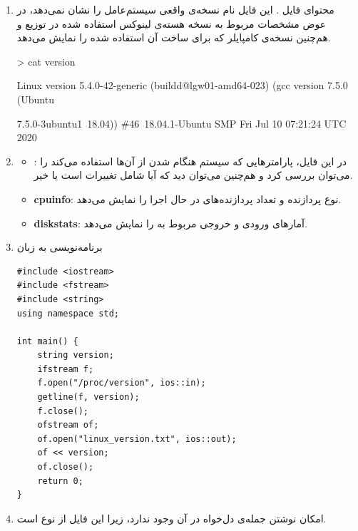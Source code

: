 \newpage


\begin{enumerate}
	\item محتوای فایل . 
	این فایل نام نسخه‌ی واقعی سیستم‌عامل را نشان نمی‌دهد، در عوض مشخصات مربوط به نسخه هسته‌ی لینوکس استفاده شده در توزیع و هم‌چنین نسخه‌ی کامپایلر  که برای ساخت آن استفاده شده را نمایش می‌دهد.
	
	\begin{code}
		> cat version
		
		Linux version 5.4.0-42-generic (buildd@lgw01-amd64-023) (gcc version 7.5.0 		(Ubuntu
		
		 7.5.0-3ubuntu1~18.04)) \#46~18.04.1-Ubuntu SMP Fri Jul 10 07:21:24 UTC 2020
	\end{code}


	\item 
	
	
	\begin{itemize}
		\item \textbf{}: در این فایل، پارامترهایی که سیستم هنگام  شدن از آن‌ها استفاده می‌کند را می‌توان بررسی کرد و هم‌چنین می‌توان دید که آیا شامل تغییرات است یا خیر.
		
		\item \textbf{cpuinfo}: نوع پردازنده و تعداد پردازنده‌های در حال اجرا را نمایش می‌دهد. 
		
		\item \textbf{diskstats}: آمارهای ورودی و خروجی مربوط به  را نمایش می‌دهد.		
	\end{itemize}

	\item
	برنامه‌نویسی به زبان 
	
		\begin{Verbatim}[tabsize=4]
#include <iostream>
#include <fstream>
#include <string>
using namespace std;

int main() {
	string version;
	ifstream f;
	f.open("/proc/version", ios::in);
	getline(f, version);
	f.close();
	ofstream of;
	of.open("linux_version.txt", ios::out);
	of << version;
	of.close();
	return 0;
}

	\end{Verbatim}
	
	\item
	امکان نوشتن جمله‌ی دل‌خواه در آن وجود ندارد، زیرا این فایل از نوع  است.
	
\end{enumerate}

